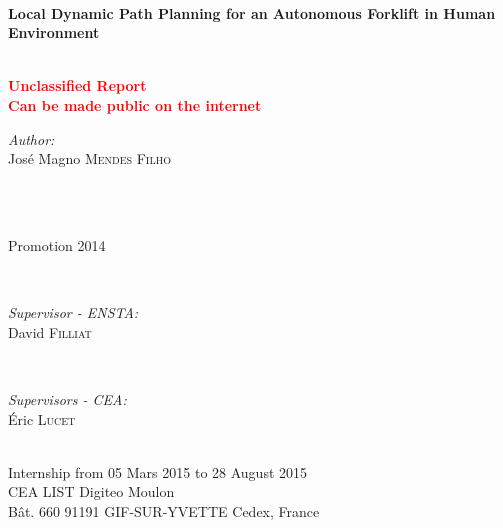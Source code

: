 \documentclass[12pt]{book}
\numberwithin{equation}{section}
\begin{document}
\begin{titlepage}

\HRule \\[0.2cm]
\Huge \textbf{Local Dynamic Path Planning for an Autonomous Forklift in Human Environment}\\[-0.2cm] %
\HRule \\[0.5cm]

\begin{center}
\textbf{\textcolor{red}{\Large{
Unclassified Report}\\[-0.4cm]%
\large{Can be made public on the internet}
}}
\end{center}

\begin{minipage}{0.55\textwidth}
\begin{flushleft} \Large
\emph{Author:}\\
José Magno \textsc{Mendes Filho} \\[0.7cm] %
\end{flushleft}
\end{minipage}
~
\begin{minipage}{0.35\textwidth}
\begin{flushright} \Large
\mbox{}\\[0.4cm]
Promotion 2014
\end{flushright}
\end{minipage}\\[1.0cm]

\begin{minipage}{0.45\textwidth}
\begin{flushleft} \large
\emph{Supervisor - ENSTA:}\\
David \textsc{Filliat} %
\end{flushleft}
\end{minipage}
~
\begin{minipage}{0.45\textwidth}
\begin{flushright} \large
\emph{Supervisors - CEA:} \\
Éric \textsc{Lucet} %
\end{flushright}
\end{minipage}\\[1.0cm]

\large{Internship from 05 Mars 2015 to 28 August 2015}\\[0.6cm]
\large{CEA LIST Digiteo Moulon\\ Bât. 660 91191 GIF-SUR-YVETTE Cedex, France}
\end{titlepage}
\thispagestyle{empty}
\end{document}
